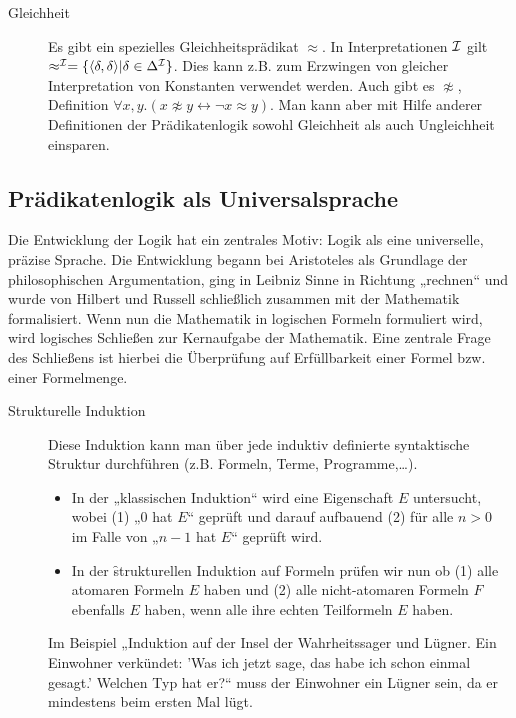 \begin{description}

        \item[Gleichheit] Es gibt ein spezielles Gleichheitsprädikat $\approx$. In Interpretationen $\mathcal{I}$ gilt $\approx^{\mathcal{I}} = \{\langle\delta,\delta\rangle|\delta\in\Delta^{\mathcal{I}}\}$.
        Dies kann z.B. zum Erzwingen von gleicher Interpretation von Konstanten verwendet werden. Auch gibt es $\not\approx$, Definition $\forall x,y.(x\not\approx y \leftrightarrow \neg x\approx y)$. Man kann aber mit Hilfe anderer Definitionen der Prädikatenlogik sowohl Gleichheit als auch Ungleichheit einsparen.  
    \end{description}


\subsection{Prädikatenlogik als Universalsprache}
    Die Entwicklung der Logik hat ein zentrales Motiv: Logik als eine universelle, präzise Sprache. Die Entwicklung begann bei Aristoteles als Grundlage der philosophischen Argumentation, ging in Leibniz Sinne in Richtung „rechnen“ und wurde von Hilbert und Russell schließlich zusammen mit der Mathematik formalisiert. Wenn nun die Mathematik in logischen Formeln formuliert wird, wird logisches Schließen zur Kernaufgabe der Mathematik. Eine zentrale Frage des Schließens ist hierbei die Überprüfung auf Erfüllbarkeit einer Formel bzw. einer Formelmenge. 
    \begin{description}
        \item[Strukturelle Induktion] Diese Induktion kann man über jede induktiv definierte syntaktische Struktur durchführen (z.B. Formeln, Terme, Programme,\dots).
            \begin{itemize}
                \item In der „klassischen Induktion“ wird eine Eigenschaft $E$ untersucht, wobei (1) „0 hat $E$“ geprüft und darauf aufbauend (2) für alle $n>0$ im Falle von „$n-1$ hat $E$“ geprüft wird.
                \item In der \f{strukturellen Induktion auf Formeln} prüfen wir nun ob (1) alle atomaren Formeln $E$ haben und (2) alle nicht-atomaren Formeln $F$ ebenfalls $E$ haben, wenn alle ihre echten Teilformeln $E$ haben.
            \end{itemize}

        Im Beispiel „Induktion auf der Insel der Wahrheitssager und Lügner. Ein Einwohner verkündet: 'Was ich jetzt sage, das habe ich schon einmal gesagt.' Welchen Typ hat er?“ muss der Einwohner ein Lügner sein, da er mindestens beim ersten Mal lügt.
    \end{description}


